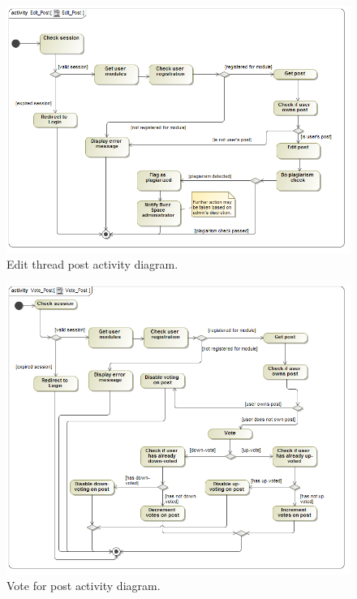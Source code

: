 \documentclass [a4paper,12pt] {article}
\begin{document}
			\begin{figure}[H]
				\centering
				\includegraphics[width=1.0\textwidth]{EditPostAD.png}
				\caption{Edit thread post activity diagram.}
			\end{figure}
			\begin{figure}[H]
				\centering
				\includegraphics[width=1.0\textwidth]{VotePostAD.png}
				\caption{Vote for post activity diagram.}
			\end{figure}
\pagebreak
\end{document}
